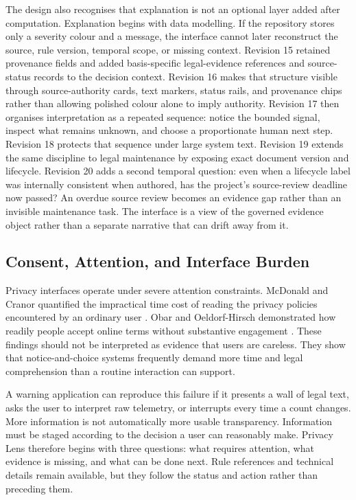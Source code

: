 The design also recognises that explanation is not an optional layer added after computation. Explanation begins with data modelling. If the repository stores only a severity colour and a message, the interface cannot later reconstruct the source, rule version, temporal scope, or missing context. Revision 15 retained provenance fields and added basis-specific legal-evidence references and source-status records to the decision context. Revision 16 makes that structure visible through source-authority cards, text markers, status rails, and provenance chips rather than allowing polished colour alone to imply authority. Revision 17 then organises interpretation as a repeated sequence: notice the bounded signal, inspect what remains unknown, and choose a proportionate human next step. Revision 18 protects that sequence under large system text. Revision 19 extends the same discipline to legal maintenance by exposing exact document version and lifecycle. Revision 20 adds a second temporal question: even when a lifecycle label was internally consistent when authored, has the project's source-review deadline now passed? An overdue source review becomes an evidence gap rather than an invisible maintenance task. The interface is a view of the governed evidence object rather than a separate narrative that can drift away from it.

\subsection{Consent, Attention, and Interface Burden}

Privacy interfaces operate under severe attention constraints. McDonald and Cranor quantified the impractical time cost of reading the privacy policies encountered by an ordinary user \cite{12}. Obar and Oeldorf-Hirsch demonstrated how readily people accept online terms without substantive engagement \cite{13}. These findings should not be interpreted as evidence that users are careless. They show that notice-and-choice systems frequently demand more time and legal comprehension than a routine interaction can support.

A warning application can reproduce this failure if it presents a wall of legal text, asks the user to interpret raw telemetry, or interrupts every time a count changes. More information is not automatically more usable transparency. Information must be staged according to the decision a user can reasonably make. Privacy Lens therefore begins with three questions: what requires attention, what evidence is missing, and what can be done next. Rule references and technical details remain available, but they follow the status and action rather than preceding them.

